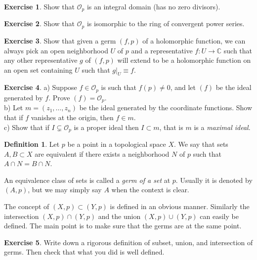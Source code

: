 \documentclass[12pt,openany]{book}
\newcommand{\C}{{\mathbb{C}}}
\newcommand{\sO}{{\mathcal{O}}}
\newcommand{\myindex}[1]{#1\index{#1}}
\theoremstyle{plain}
\theoremstyle{remark}
\theoremstyle{definition}
\newtheorem{defn}[thm]{Definition}
\newenvironment{exbox}{%
    \def\FrameCommand{\vrule width 1pt \relax\hspace {10pt}}%
    \MakeFramed {\advance \hsize -\width \FrameRestore }%
}{%
    \endMakeFramed
}
\theoremstyle{exercise}
\newtheorem{exercise}{Exercise}[section]
\theoremstyle{example}
\begin{document}
\begin{exbox}
\begin{exercise}
Show that $\sO_p$ is an integral domain (has no zero divisors).
\end{exercise}

\begin{exercise}
Show that $\sO_p$ is isomorphic to the ring of convergent power series.
\end{exercise}

\begin{exercise}
Show that given a germ $(f,p)$ of a holomorphic function,
we can always pick an open neighborhood $U$
of $p$ and a representative $f \colon U \to \C$ such that any other
representative $g$
of $(f,p)$ will extend to be a holomorphic function on an open set containing
$U$ such that $g|_U \equiv f$.
\end{exercise}

\begin{exercise}
a) Suppose $f \in \sO_p$ is such that $f(p) \not= 0$, and let
$(f)$ be the ideal generated by $f$.  Prove $(f) = \sO_p$.\\
b) Let $m = (z_1,\ldots,z_n)$ be the ideal generated by the coordinate
functions.  Show that if $f$ vanishes at the origin, then $f \in m$.
\\
c) Show that if $I \subsetneq \sO_p$ is a proper ideal then
$I \subset m$, that is $m$ is a \emph{\myindex{maximal ideal}}.
\end{exercise}
\end{exbox}


\begin{defn}
Let $p$ be a point in a topological space $X$.
We say that sets $A, B \subset X$ are equivalent
if there exists a neighborhood $N$ of $p$
such that $A \cap N = B \cap N$.

An equivalence class of sets 
is called a \emph{\myindex{germ of a set}} at $p$.
Usually it is denoted by $(A,p)$, but we may simply say $A$ when
the context is clear.
\end{defn}

The concept of $(X,p) \subset (Y,p)$ is defined in an obvious manner.
Similarly the intersection $(X,p) \cap (Y,p)$ and
the union $(X,p) \cup (Y,p)$ can easily be defined.  The main point is to
make sure that the germs are at the same point.

\begin{exbox}
\begin{exercise}
Write down a rigorous definition of subset, union, and intersection of germs.
Then check that what you did is well defined.
\end{exercise}
\end{exbox}
\end{document}
